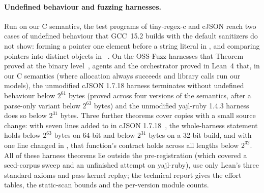 \paragraph{Undefined behaviour and fuzzing harnesses.}
\label{sec:ub}
Run on our C semantics, the test programs of tiny-regex-c and cJSON reach two cases of undefined behaviour that
GCC~15.2 builds with the default sanitizers do not show: forming a pointer one element before a string literal in
, and comparing pointers into distinct objects in ~\cite{cjson919}. On the
OSS-Fuzz harnesses that Theorem proved at the binary level~\cite{theoremossverify}, agents and the orchestrator proved
in Lean~4 that, in our C semantics (where allocation always succeeds and library calls run our models), the unmodified
cJSON 1.7.18 harness terminates without undefined behaviour below $2^{61}$ bytes (proved across four versions of the
semantics, after a parse-only variant below $2^{63}$ bytes) and the unmodified yajl-ruby 1.4.3 harness does so below
$2^{31}$ bytes. Three further theorems cover copies with a small source change: with seven lines added to
 in cJSON 1.7.18~\cite{cve202616554}, the whole-harness statement holds below $2^{63}$ bytes on
64-bit and below $2^{31}$ bytes on a 32-bit build, and with one line changed in , that
function's contract holds across all  lengths below $2^{32}$. All of these harness theorems lie
outside the pre-registration (which covered a seed-corpus sweep and an unfinished attempt on yajl-ruby), use only
Lean's three standard axioms and pass kernel replay; the technical report gives the effort tables, the static-scan
bounds and the per-version module counts.
